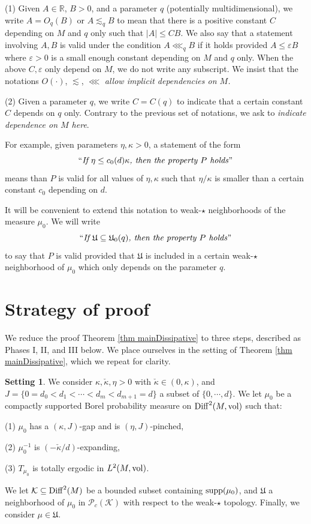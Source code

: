 \documentclass[11pt, leqno, fleqn]{amsart}
\def\cU{\mathfrak U}
\def\eps{\varepsilon}
\def \R{{\mathbb R}}
\newcommand{\cP}{{\mathcal P}}
\newcommand{\cK}{{\mathcal K}}
\theoremstyle{definition}
\newtheorem{setting}[thm]{\bf Setting}
\theoremstyle{definition}
\def\supp{{\rm supp}}
\def \vol{  {\rm vol} }
\newcommand{\Diff}{{\rm Diff}}
\begin{document}
\bigskip
{} 
(1) Given $A\in \R$, $B>0$, and a parameter $q$ (potentially multidimensional), we write $A = O_{q}(B)$ or $A \lesssim_{q} B$  to mean that there is a positive constant $C$ depending  on $M$ and $q$ only such that $|A| \leq C B$.
We also say that a statement involving $A,B$  is valid under the condition $A\lll_{q} B$ if it holds provided  $A\leq \eps B$ where $\eps>0$ is a small enough constant depending on $M$ and $q$ only. 
When the above $C,\eps$ only depend on $M$, we do not write any subscript. We insist that the notations $O(\cdot)$, $\lesssim$, $\lll$ \emph{allow implicit dependencies on $M$. } 


\bigskip
(2) Given a parameter $q$, we write $C=C(q)$ to indicate that a certain constant $C$ depends on $q$ only. Contrary to the previous set of notations, we ask to \emph{indicate dependence on $M$ here}. 

For example, given parameters $\eta, \kappa>0$, a statement of the form
 $$\text{``\emph{If $\eta \leq c_{0}(d)\kappa$, then the property $P$ holds}''}$$
means than $P$ is valid for all values of $\eta,\kappa$ such that $\eta/\kappa$ is smaller than a certain constant $c_{0}$ depending on $d$. 
 
 It will be convenient to extend this notation to weak-$\star$ neighborhoods of the measure $\mu_{0}$. We will write
 $$\text{``\emph{If $\cU \subseteq \cU_{0}(q)$, then the property $P$ holds}''}$$
  to say that $P$ is valid provided that $\cU$ is included in a certain weak-$\star$  neighborhood of $\mu_{0}$ which only depends on the parameter $q$.

 
   
 
  
  \section{Strategy of  proof} \label{sec Strategyoftheproof} 
    
    
 
    
We reduce the proof Theorem \ref{thm mainDissipative} to three steps, described as Phases I, II, and III below. We place ourselves in the setting of Theorem \ref{thm mainDissipative}, which we repeat for clarity. 

     	\begin{setting}\label{Setting-main-result}
	We consider    $\kappa, \check{\kappa}, \eta> 0$ with $\check{\kappa}\in (0, \kappa)$, and  $J = \{  0 = d_0 < d_1 <   \cdots < d_m < d_{m+1} = d \}$  a subset of $ \{0, \cdots, d \}$. 
	We let $\mu_0$ be a compactly supported Borel probability measure on $\Diff^{2}(M, \vol)$ such that: 
	
	(1) $\mu_0$  has a $(\kappa, J)$-gap and is $(\eta, J)$-pinched, 
	
	(2) $\mu_{0}^{-1}$ is $(-\check{\kappa}/d)$-expanding, 
	
	 (3) $T_{\mu_0}$ is totally ergodic in $L^2(M, \vol)$.
	 
	We let $\cK  \subseteq \Diff^{2}(M)$ be a bounded subset containing $\supp(\mu_0)$, and 
	$\cU$ a  neighborhood  of $\mu_0$ in $\cP_c(\cK)$ with respect to the weak-$\star$ topology.  Finally, we consider $\mu\in \cU$. 
	\end{setting}
\end{document}
